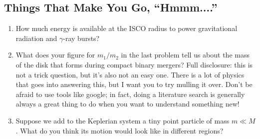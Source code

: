 \documentclass[11pt]{article}
\begin{document}

\begin{mdframed}

\section*{Things That Make You Go, ``Hmmm....''}

\begin{enumerate}

\item How much energy is available at the ISCO radius to power gravitational radiation and $\gamma$-ray bursts?

\item What does your figure for $m_1/m_2$ in the last problem tell us about the mass of the disk that forms during compact binary mergers? Full disclosure: this is not a trick question, but it's also not an easy one. There is a lot of physics that goes into answering this, but I want you to try mulling it over. Don't be afraid to use tools like google; in fact, doing a literature search is generally always a great thing to do when you want to understand something new!

\item Suppose we add to the Keplerian system a tiny point particle of mass $m \ll M$. What do you think its motion would look like in different regions?

\end{enumerate}

\end{mdframed}
\end{document}
